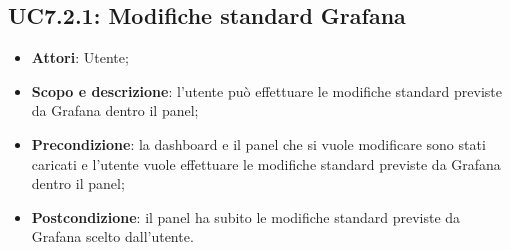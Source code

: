 \subsection{UC7.2.1: Modifiche standard Grafana}
\hypertarget{UC7.2.1}{}
\begin{itemize}
	\item \textbf{Attori}: Utente;
	\item \textbf{Scopo e descrizione}: l'utente può effettuare le modifiche standard previste da Grafana dentro il panel;
	\item \textbf{Precondizione}: la dashboard e il panel che si vuole modificare sono stati caricati e l'utente vuole effettuare le modifiche standard previste da Grafana dentro il panel;
	\item \textbf{Postcondizione}: il panel ha subito le modifiche standard previste da Grafana scelto dall'utente.
\end{itemize}
